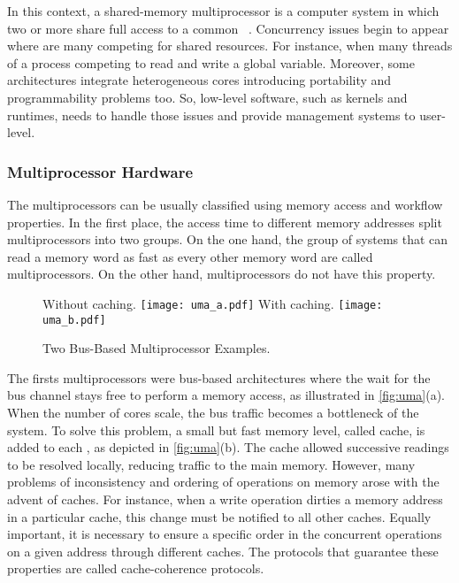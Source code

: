 		In this context, a shared-memory multiprocessor is a computer system
		in which two or more \cpus share full access to a common \ram~\cite{tanenbaum:4ed}.
		Concurrency issues begin to appear where are many \cpus competing for
		shared resources.
		For instance, when many threads of a process competing to read and write a global variable.
		Moreover, some architectures integrate heterogeneous cores introducing portability
		and programmability problems too.
		So, low-level software, such as \os kernels and runtimes, needs to handle those
		issues and provide management systems to user-level.

		\subsubsection{Multiprocessor Hardware}
		\label{sec.multiprocessor-hw}

			The multiprocessors can be usually classified using memory access
			and workflow properties.
			In the first place, the access time to different memory addresses
			split multiprocessors into two groups.
			On the one hand, the group of systems that can read a memory word
			as fast as every other memory word are called \uma multiprocessors.
			On the other hand, \numa multiprocessors do not have this property.

			\begin{figure}[t]
				\centering%
				\caption{Two Bus-Based \uma Multiprocessor Examples.}%
				\label{fig:uma}%

					{Without caching.}%
					{\texttt{[image: uma\_a.pdf]}}%
				\hspace{1.5cm}%
					{With caching.}%
					{\texttt{[image: uma\_b.pdf]}}%

			\end{figure}

			The firsts \uma multiprocessors were bus-based architectures where
			the \cpu wait for the bus channel stays free to perform a memory
			access, as illustrated in \autoref{fig:uma}(a).
			When the number of cores scale, the bus traffic becomes a
			bottleneck of the system.
			To solve this problem, a small but fast memory level, called cache,
			is added to each \cpu, as depicted in \autoref{fig:uma}(b).
			The cache allowed successive readings to be resolved locally,
			reducing traffic to the main memory.
			However, many problems of inconsistency and ordering of operations
			on memory arose with the advent of caches.
			For instance, when a write operation dirties a memory address in
			a particular cache, this change must be notified to all other caches.
			Equally important, it is necessary to ensure a specific order in
			the concurrent operations on a given address through different caches.
			The protocols that guarantee these properties are called cache-coherence protocols.

